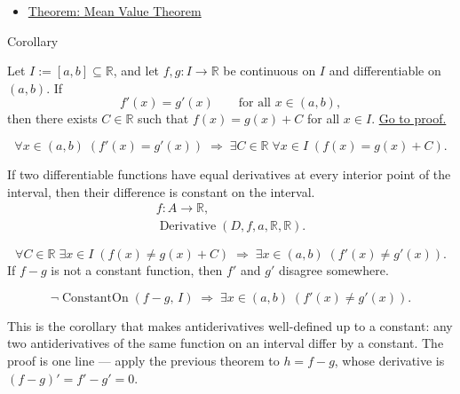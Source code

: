 \begin{dependencies}
\begin{itemize}
  \item \hyperref[thm:mean-value-theorem]{Theorem: Mean Value Theorem}
\end{itemize}
\end{dependencies}


\begin{corollarybox}{Corollary}
\begin{corollary}
\label{cor:equal-derivatives-constant-difference}
Let $I := [a,b] \subseteq \mathbb{R}$, and let $f, g : I \to \mathbb{R}$ be continuous on $I$ and differentiable on $(a,b)$. If
\[
f'(x) = g'(x) \qquad \text{for all } x \in (a,b),
\]
then there exists $C \in \mathbb{R}$ such that $f(x) = g(x) + C$ for all $x \in I$.
\hyperref[prf:equal-derivatives-constant-difference]{Go to proof.}
\end{corollary}
\end{corollarybox}

\begin{remark*}
\[
\forall x \in (a,b)\;(f'(x)=g'(x))
\;\Rightarrow\;
\exists C \in \mathbb{R}\;\forall x \in I\;(f(x)=g(x)+C).
\]
\end{remark*}

\begin{remark*}
If two differentiable functions have equal derivatives at every interior
point of the interval, then their difference is constant on the interval.
\[
\begin{aligned}
  f\colon A\to\mathbb{R},\\
  \operatorname{Derivative}(D,f,a,\mathbb{R},\mathbb{R}).
\end{aligned}
\]
\end{remark*}

\begin{remark*}[Interpretation]
\[
\forall C \in \mathbb{R}\;\exists x \in I\;(f(x) \neq g(x)+C)
\;\Rightarrow\;
\exists x \in (a,b)\;(f'(x) \neq g'(x)).
\]
If $f - g$ is not a constant function, then $f'$ and $g'$ disagree somewhere.


\[
\lnot\operatorname{ConstantOn}(f-g,\,I) \;\Rightarrow\; \exists x\in(a,b)\;(f'(x)\neq g'(x)).
\]


This is the corollary that makes antiderivatives well-defined up to a constant: any two antiderivatives of the same function on an interval differ by a constant. The proof is one line --- apply the previous theorem to $h = f - g$, whose derivative is $(f-g)' = f'-g' = 0$.
\end{remark*}

